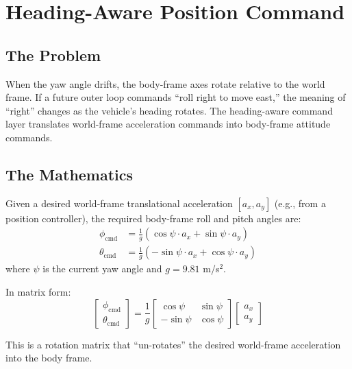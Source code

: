 \documentclass[12pt, a4paper]{article}
\begin{document}
\section{Heading-Aware Position Command}
\label{sec:heading_cmd}

\subsection{The Problem}

When the yaw angle drifts, the body-frame axes rotate relative to the world frame.  If a future outer loop commands ``roll right to move east,'' the meaning of ``right'' changes as the vehicle's heading rotates.  The heading-aware command layer translates world-frame acceleration commands into body-frame attitude commands.

\subsection{The Mathematics}

Given a desired world-frame translational acceleration $[a_x, a_y]$ (e.g., from a position controller), the required body-frame roll and pitch angles are:
\begin{align}
    \phi_{\text{cmd}} &= \frac{1}{g} \left( \cos\psi \cdot a_x + \sin\psi \cdot a_y \right) \\
    \theta_{\text{cmd}} &= \frac{1}{g} \left( -\sin\psi \cdot a_x + \cos\psi \cdot a_y \right)
\end{align}
where $\psi$ is the current yaw angle and $g = 9.81$ m/s$^2$.

In matrix form:
\begin{equation}
    \begin{bmatrix} \phi_{\text{cmd}} \\ \theta_{\text{cmd}} \end{bmatrix}
    = \frac{1}{g}
    \begin{bmatrix} \cos\psi & \sin\psi \\ -\sin\psi & \cos\psi \end{bmatrix}
    \begin{bmatrix} a_x \\ a_y \end{bmatrix}
\end{equation}

This is a rotation matrix that ``un-rotates'' the desired world-frame acceleration into the body frame.
\end{document}
